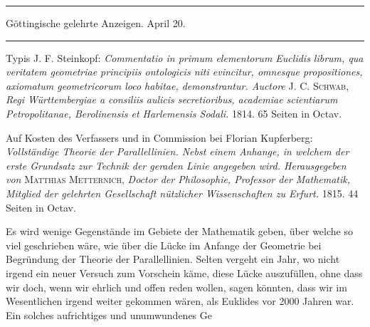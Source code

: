 \clearpage
{}\begin{center}
{\Large{}}
\end{center}

\bigskip
\hrule
\begin{center}
Göttingische gelehrte Anzeigen.  April 20.
\end{center}
\hrule

\bigskip
\begin{center}
{\large{}}
\end{center}

Typis J. F. Steinkopf: \emph{Commentatio in primum elementorum Euclidis librum,
qua veritatem geometriae principiis ontologicis niti evincitur, omnesque
  propositiones, axiomatum geometricorum loco habitae, demonstrantur. Auctore}
  J. C. \textsc{Schwab}, \emph{Regi Württembergiae a consiliis aulicis
secretioribus, academiae scientiarum Petropolitanae, Berolinensis et Harlemensis
Sodali.} 1814. 65 Seiten in Octav.

\begin{center}
{\large{}}
\end{center}

Auf Kosten des Verfassers und in Commission bei Florian Kupferberg:
\emph{Vollständige Theorie der Parallellinien. Nebst einem Anhange, in welchem
der erste Grundsatz zur Technik der geraden Linie angegeben wird. Herausgegeben
von} \textsc{Matthias Metternich}, \emph{Doctor der Philosophie, Professor der
Mathematik, Mitglied der gelehrten Gesellschaft nützlicher Wissenschaften zu
Erfurt.} 1815. 44 Seiten in Octav.

Es wird wenige Gegenstände im Gebiete der Mathematik geben, über welche so viel
geschrieben wäre, wie über die Lücke im Anfange der Geometrie bei Begründung der
Theorie der Parallellinien. Selten vergeht ein Jahr, wo nicht irgend ein neuer
Versuch zum Vorschein käme, diese Lücke auszufüllen, ohne dass wir doch, wenn wir
ehrlich und offen reden wollen, sagen könnten, dass wir im Wesentlichen irgend
weiter gekommen wären, als Euklides vor 2000 Jahren war. Ein solches
aufrichtiges und unumwundenes Ge%
